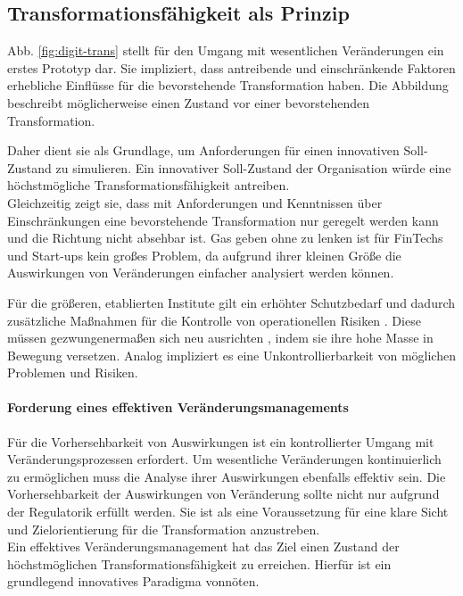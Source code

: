 \subsection{Transformationsfähigkeit als Prinzip}
 
Abb. \ref{fig:digit-trans} stellt für den Umgang mit wesentlichen Veränderungen ein erstes Prototyp dar. Sie impliziert, dass antreibende und einschränkende Faktoren erhebliche Einflüsse für die bevorstehende Transformation haben. Die Abbildung beschreibt möglicherweise einen Zustand vor einer bevorstehenden Transformation.

Daher dient sie als Grundlage, um Anforderungen für einen innovativen Soll-Zustand zu simulieren. Ein innovativer Soll-Zustand der Organisation würde eine höchstmögliche Transformationsfähigkeit antreiben. 
\medskip
\\
Gleichzeitig zeigt sie, dass mit Anforderungen und Kenntnissen über Einschränkungen eine bevorstehende Transformation nur geregelt werden kann und die Richtung nicht absehbar ist. Gas geben ohne zu lenken ist für FinTechs und Start-ups kein großes Problem, da aufgrund ihrer kleinen Größe die Auswirkungen von Veränderungen einfacher analysiert werden können.

Für die größeren, etablierten Institute gilt ein erhöhter Schutzbedarf \cite{recht/Bornemann2018} und dadurch zusätzliche Maßnahmen für die Kontrolle von operationellen Risiken \cite{MaRisk:2017, BAIT:2018}. Diese müssen gezwungenermaßen sich neu ausrichten \citet{Bussmann2006, Gupta:2017}, indem sie ihre hohe Masse in Bewegung versetzen. Analog impliziert es eine Unkontrollierbarkeit von möglichen Problemen und Risiken.

\paragraph{Forderung eines effektiven Veränderungsmanagements}
Für die Vorhersehbarkeit von Auswirkungen ist ein kontrollierter Umgang mit Veränderungsprozessen erfordert. Um wesentliche Veränderungen kontinuierlich zu ermöglichen muss die Analyse ihrer Auswirkungen \cite{MaRisk:2017} ebenfalls effektiv sein. Die Vorhersehbarkeit der Auswirkungen von Veränderung sollte nicht nur aufgrund der Regulatorik erfüllt werden. Sie ist als eine Voraussetzung für eine klare Sicht und Zielorientierung für die Transformation anzustreben.
\medskip
\\
Ein effektives Veränderungsmanagement hat das Ziel einen Zustand der höchstmöglichen Transformationsfähigkeit zu erreichen. Hierfür ist ein grundlegend innovatives Paradigma vonnöten. 

